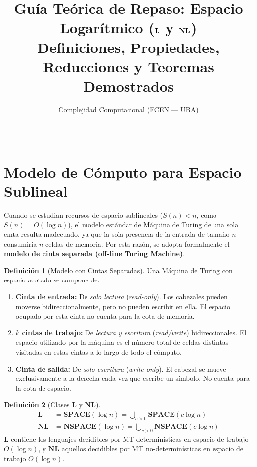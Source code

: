 \documentclass[11pt, a4paper]{article}
\title{\textbf{Guía Teórica de Repaso: Espacio Logarítmico ($\classL$ y $\classNL$)}\\\large Definiciones, Propiedades, Reducciones y Teoremas Demostrados}
\author{Complejidad Computacional (FCEN --- UBA)}
\date{}
\theoremstyle{definition}
\newtheorem{definicion}{Definición}[section]
\theoremstyle{plain}
\theoremstyle{remark}
\newcommand{\classL}{\mathbf{L}}
\newcommand{\classNL}{\mathbf{NL}}
\newcommand{\SPACE}{\mathbf{SPACE}}
\newcommand{\NSPACE}{\mathbf{NSPACE}}
\begin{document}
\maketitle

\tableofcontents
\vspace{1em}
\hrule
\vspace{1.5em}

\section{Modelo de Cómputo para Espacio Sublineal}

Cuando se estudian recursos de espacio sublineales ($S(n) < n$, como $S(n) = O(\log n)$), el modelo estándar de Máquina de Turing de una sola cinta resulta inadecuado, ya que la sola presencia de la entrada de tamaño $n$ consumiría $n$ celdas de memoria. Por esta razón, se adopta formalmente el \textbf{modelo de cinta separada (off-line Turing Machine)}.

\begin{definicion}[Modelo con Cintas Separadas]
Una Máquina de Turing con espacio acotado se compone de:
\begin{enumerate}[label=\alph*.]
    \item \textbf{Cinta de entrada:} De \textit{solo lectura} (\textit{read-only}). Los cabezales pueden moverse bidireccionalmente, pero no pueden escribir en ella. El espacio ocupado por esta cinta no cuenta para la cota de memoria.
    \item \textbf{$k$ cintas de trabajo:} De \textit{lectura y escritura} (\textit{read/write}) bidireccionales. El espacio utilizado por la máquina es el número total de celdas distintas visitadas en estas cintas a lo largo de todo el cómputo.
    \item \textbf{Cinta de salida:} De \textit{solo escritura} (\textit{write-only}). El cabezal se mueve exclusivamente a la derecha cada vez que escribe un símbolo. No cuenta para la cota de espacio.
\end{enumerate}
\end{definicion}

\begin{definicion}[Clases $\classL$ y $\classNL$]
\begin{align*}
    \classL &= \SPACE(\log n) = \bigcup_{c > 0} \SPACE(c \log n) \\
    \classNL &= \NSPACE(\log n) = \bigcup_{c > 0} \NSPACE(c \log n)
\end{align*}
$\classL$ contiene los lenguajes decidibles por MT determinísticas en espacio de trabajo $O(\log n)$, y $\classNL$ aquellos decidibles por MT no-determinísticas en espacio de trabajo $O(\log n)$.
\end{definicion}
\end{document}
